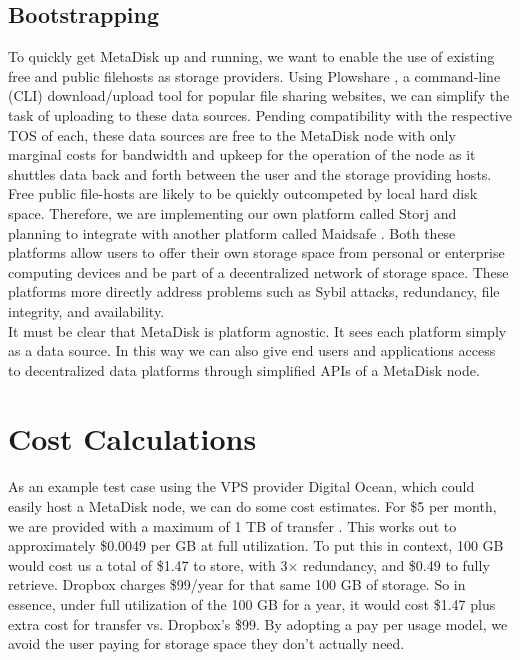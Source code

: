 \documentclass[a4paper,10pt]{article}
\begin{document}
\subsection{Bootstrapping}

To quickly get MetaDisk up and running, we want to enable the use of existing free and public filehosts as storage providers. Using Plowshare \cite{6}, a command-line (CLI) download/upload tool for popular file sharing websites, we can simplify the task of uploading to these data sources. Pending compatibility with the respective TOS of each, these data sources are free to the MetaDisk node with only marginal costs for bandwidth and upkeep for the operation of the node as it shuttles data back and forth between the user and the storage providing hosts.  \\

Free public file-hosts are likely to be quickly outcompeted by local hard disk space. Therefore, we are implementing our own platform called Storj \cite{7} and planning to integrate with another platform called Maidsafe \cite{1}. Both these platforms allow users to offer their own storage space from personal or enterprise computing devices and be part of a decentralized network of storage space. These platforms more directly address problems such as Sybil attacks, redundancy, file integrity, and availability.    \\

It must be clear that MetaDisk is platform agnostic. It sees each platform simply as a data source. In this way we can also give end users and applications access to decentralized data platforms through simplified APIs of a MetaDisk node. 

\section{Cost Calculations}

As an example test case using the VPS provider Digital Ocean, which could easily host a MetaDisk node, we can do some cost estimates. For \$5 per month, we are provided with a maximum of 1 TB of transfer \cite{8}. This works out to approximately \$0.0049 per GB at full utilization. To put this in context, 100 GB would cost us a total of \$1.47 to store, with 3× redundancy, and \$0.49 to fully retrieve.  Dropbox charges \$99/year for that same 100 GB of storage. So in essence, under full utilization of the 100 GB for a year, it would cost \$1.47 plus extra cost for transfer vs. Dropbox’s \$99.  By adopting a pay per usage model, we avoid the user  paying for storage space they don’t actually need.
\end{document}
